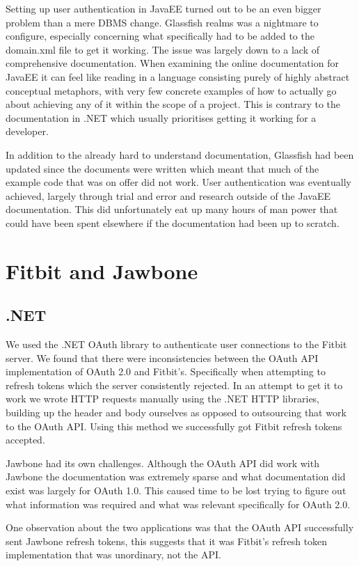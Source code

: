 Setting up user authentication in JavaEE turned out to be an even bigger problem than a mere DBMS change. Glassfish realms was a nightmare to configure, especially concerning what specifically had to be added to the domain.xml file to get it working. The issue was largely down to a lack of comprehensive documentation. When examining the online documentation for JavaEE it can feel like reading in a language consisting purely of highly abstract conceptual metaphors, with very few concrete examples of how to actually go about achieving any of it within the scope of a project. This is contrary to the documentation in .NET which usually prioritises getting it working for a developer. \par
In addition to the already hard to understand documentation, Glassfish had been updated since the documents were written which meant that much of the example code that was on offer did not work. User authentication was eventually achieved, largely through trial and error and research outside of the JavaEE documentation. This did unfortunately eat up many hours of man power that could have been spent elsewhere if the documentation had been up to scratch.
\section{Fitbit and Jawbone}
\subsection{.NET}
We used the .NET OAuth library to authenticate user connections to the Fitbit server. We found that there were inconsistencies between the OAuth API implementation of OAuth 2.0 and Fitbit’s. Specifically when attempting to refresh tokens which the server consistently rejected. In an attempt to get it to work we wrote HTTP requests manually using the .NET HTTP libraries, building up the header and body ourselves as opposed to outsourcing that work to the OAuth API. Using this method we successfully got Fitbit refresh tokens accepted. \par
Jawbone had its own challenges. Although the OAuth API did work with Jawbone the documentation was extremely sparse and what documentation did exist was largely for OAuth 1.0. This caused time to be lost trying to figure out what information was required and what was relevant specifically for OAuth 2.0. \par
One observation about the two applications was that the OAuth API successfully sent Jawbone refresh tokens, this suggests that it was Fitbit’s refresh token implementation that was unordinary, not the API.
